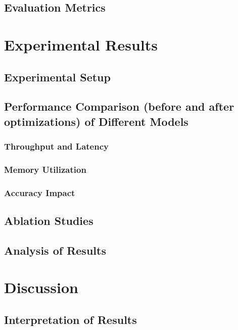 \documentclass[11pt]{article}
\begin{document}
  \subsection{Evaluation Metrics}

\section{Experimental Results}
  \subsection{Experimental Setup}

  \subsection{Performance Comparison (before and after optimizations) of Different Models}
  \subsubsection{Throughput and Latency}
  \subsubsection{Memory Utilization}
  \subsubsection{Accuracy Impact}

  \subsection{Ablation Studies}

  \subsection{Analysis of Results}

\section{Discussion}
  \subsection{Interpretation of Results}
\end{document}
